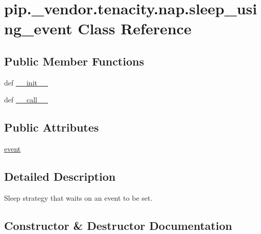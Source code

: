 \hypertarget{classpip_1_1__vendor_1_1tenacity_1_1nap_1_1sleep__using__event}{}\section{pip.\+\_\+vendor.\+tenacity.\+nap.\+sleep\+\_\+using\+\_\+event Class Reference}
\label{classpip_1_1__vendor_1_1tenacity_1_1nap_1_1sleep__using__event}
\subsection*{Public Member Functions}
\begin{DoxyCompactItemize}
\item 
def \hyperlink{classpip_1_1__vendor_1_1tenacity_1_1nap_1_1sleep__using__event_aa57187d4f42386a3354de5c36654f53b}{\+\_\+\+\_\+init\+\_\+\+\_\+}
\item 
def \hyperlink{classpip_1_1__vendor_1_1tenacity_1_1nap_1_1sleep__using__event_adf438a30eb2671f45a3120ca7374affe}{\+\_\+\+\_\+call\+\_\+\+\_\+}
\end{DoxyCompactItemize}
\subsection*{Public Attributes}
\begin{DoxyCompactItemize}
\item 
\hyperlink{classpip_1_1__vendor_1_1tenacity_1_1nap_1_1sleep__using__event_a2a6c389b200726abb62d4e06f4cde3d4}{event}
\end{DoxyCompactItemize}


\subsection{Detailed Description}
\begin{DoxyVerb}Sleep strategy that waits on an event to be set.\end{DoxyVerb}
 

\subsection{Constructor \& Destructor Documentation}
\mbox{\label{classpip_1_1__vendor_1_1tenacity_1_1nap_1_1sleep__using__event_aa57187d4f42386a3354de5c36654f53b}} 
